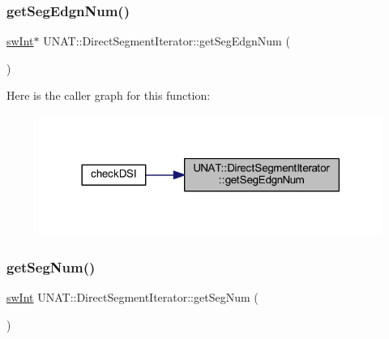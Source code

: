 \mbox{\label{classUNAT_1_1DirectSegmentIterator_ac3a4d43d27e6ba2a4bf68eb22af2c0ce}} 
\subsubsection{\texorpdfstring{getSegEdgnNum()}{getSegEdgnNum()}\hspace{0.1cm}{\footnotesize\ttfamily [2/2]}}
{\footnotesize\ttfamily \mbox{\hyperlink{include_2swMacro_8h_a113cf5f6b5377cdf3fac6aa4e443e9aa}{sw\+Int}}$\ast$ U\+N\+A\+T\+::\+Direct\+Segment\+Iterator\+::get\+Seg\+Edgn\+Num (\begin{DoxyParamCaption}{ }\end{DoxyParamCaption})\hspace{0.3cm}{\ttfamily [inline]}}

Here is the caller graph for this function\+:
\nopagebreak
\begin{figure}[H]
\begin{center}
\leavevmode
\includegraphics[width=318pt]{classUNAT_1_1DirectSegmentIterator_ac3a4d43d27e6ba2a4bf68eb22af2c0ce_icgraph}
\end{center}
\end{figure}
\mbox{\label{classUNAT_1_1DirectSegmentIterator_a1c5edf64608f43c1bdf9a43ecb2b0b03}} 
\subsubsection{\texorpdfstring{getSegNum()}{getSegNum()}\hspace{0.1cm}{\footnotesize\ttfamily [1/2]}}
{\footnotesize\ttfamily \mbox{\hyperlink{include_2swMacro_8h_a113cf5f6b5377cdf3fac6aa4e443e9aa}{sw\+Int}} U\+N\+A\+T\+::\+Direct\+Segment\+Iterator\+::get\+Seg\+Num (\begin{DoxyParamCaption}{ }\end{DoxyParamCaption})\hspace{0.3cm}{\ttfamily [inline]}}

